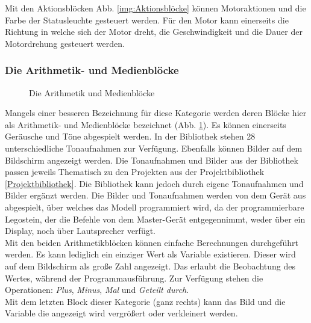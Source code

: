Mit den Aktionsblöcken Abb. \ref{img:Aktionsblöcke} können Motoraktionen und die Farbe der Statusleuchte gesteuert werden. Für den Motor kann einerseits die Richtung in welche sich der Motor dreht, die Geschwindigkeit und die Dauer der Motordrehung gesteuert werden.

\subsubsection{Die Arithmetik- und Medienblöcke}
\begin{figure}[htbp!]
	\centering
	\caption[Die Arithmetik und Medienblöcke]{Die Arithmetik und Medienblöcke} %
	\label{img:ArithmetikUndMedienblöcke}
\end{figure}
Mangels einer besseren Bezeichnung für diese Kategorie werden deren Blöcke hier als  Arithmetik- und Medienblöcke bezeichnet (Abb. \ref{img:ArithmetikUndMedienblöcke}). Es können einerseits Geräusche und Töne abgespielt werden. In der Bibliothek stehen 28 unterschiedliche Tonaufnahmen zur Verfügung. Ebenfalls können Bilder auf dem Bildschirm angezeigt werden. Die Tonaufnahmen und Bilder aus der Bibliothek passen jeweils Thematisch zu den Projekten aus der Projektbibliothek \ref{Projektbibliothek}. Die Bibliothek kann jedoch durch eigene Tonaufnahmen und Bilder ergänzt werden. Die Bilder und Tonaufnahmen werden von dem Gerät aus abgespielt, über welches das Modell programmiert wird, da der programmierbare Legostein, der die Befehle von dem Master-Gerät entgegennimmt, weder über ein Display, noch über Lautsprecher verfügt.\\
Mit den beiden Arithmetikblöcken können einfache Berechnungen durchgeführt werden. Es kann lediglich ein einziger Wert als Variable existieren. Dieser wird auf dem Bildschirm als große Zahl angezeigt. Das erlaubt die Beobachtung des Wertes, während der Programmausführung. Zur Verfügung stehen die Operationen: \textit{Plus}, \textit{Minus}, \textit{Mal} und \textit{Geteilt durch}.\\
Mit dem letzten Block dieser Kategorie (ganz rechts) kann das Bild und die Variable die angezeigt wird vergrößert oder verkleinert werden.

